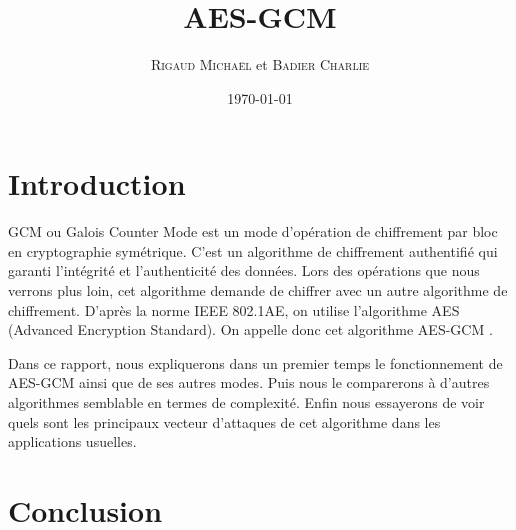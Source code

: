\documentclass[a4paper, 11pt, oneside, oldfontcommands]{memoir}
\title{AES-GCM}
\author{\textsc{Rigaud Michaël} et \textsc{Badier Charlie}}
\date{\today}
\newcounter{rem}[chapter]
\newcounter{th}[chapter]
\newcommand{\aes}{AES-GCM }
\begin{document}
\maketitle
\thispagestyle{empty}
\newpage

\tableofcontents



\chapter*{Introduction}

GCM ou Galois Counter Mode est un mode d'opération de chiffrement par bloc en cryptographie symétrique. C'est un algorithme de chiffrement authentifié qui garanti l'intégrité et l'authenticité des données. Lors des opérations que nous verrons plus loin, cet algorithme demande de chiffrer avec un autre algorithme de chiffrement. D'après la norme IEEE 802.1AE, on utilise l'algorithme AES (Advanced Encryption Standard). On appelle donc cet algorithme \aes.

Dans ce rapport, nous expliquerons dans un premier temps le fonctionnement de \aes ainsi que de ses autres modes. Puis nous le comparerons à d'autres algorithmes semblable en termes de complexité. Enfin nous essayerons de voir quels sont les principaux vecteur d'attaques de cet algorithme dans les applications usuelles.


\newpage	  






\chapter*{Conclusion}
\newpage


\appendix
\nocite{*}
%
\newpage
 \listoffigures
 \printindex
 
  
\end{document}
